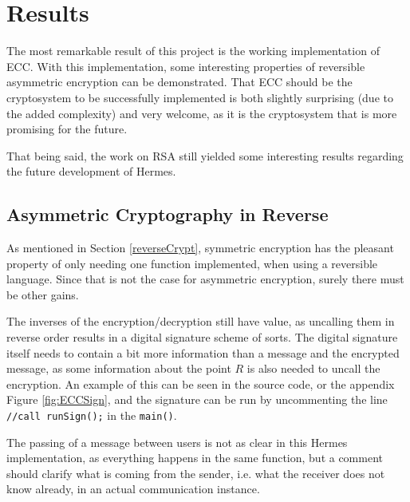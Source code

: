 
\chapter{Results}
\label{Results}
The most remarkable result of this project is the working implementation of ECC. With this implementation, some interesting properties of reversible asymmetric encryption can be demonstrated. That ECC should be the cryptosystem to be successfully implemented is both slightly surprising (due to the added complexity) and very welcome, as it is the cryptosystem that is more promising for the future.

That being said, the work on RSA still yielded some interesting results regarding the future development of Hermes.
\section{Asymmetric Cryptography in Reverse}
As mentioned in Section \ref{reverseCrypt}, symmetric encryption has the pleasant property of only needing one function implemented, when using a reversible language. Since that is not the case for asymmetric encryption, surely there must be other gains. 

The inverses of the encryption/decryption still have value, as uncalling them in reverse order results in a digital signature scheme of sorts. The digital signature itself needs to contain a bit more information than a message and the encrypted message, as some information about the point $R$ is also needed to uncall the encryption. An example of this can be seen in the source code, or the appendix Figure \ref{fig:ECCSign}, and the signature can be run by uncommenting the line \texttt{//call runSign();} in the \texttt{main()}.

The passing of a message between users is not as clear in this Hermes implementation, as everything happens in the same function, but a comment should clarify what is coming from the sender, i.e. what the receiver does not know already, in an actual communication instance. 

